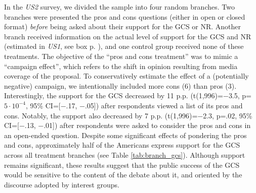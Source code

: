 \begin{bibunit}
In the \textit{US2} survey, we divided the sample into four random branches. Two branches were presented the pros and cons questions (either in open or closed format) \textit{before} being asked about their support for the GCS or NR. Another branch received information on the actual level of support for the GCS and NR (estimated in \textit{US1}, see box p. \pageref{subsec:second_order_beliefs}), %
and one control group received none of these treatments. %
The objective of the ``pros and cons treatment'' was to mimic a ``campaign effect'', which refers to the shift in opinion resulting from media coverage of the proposal.\citep{anderson_can_2023} To conservatively estimate the effect of a (potentially negative) campaign, we intentionally included more cons (6) than pros (3). Interestingly, the support for the GCS decreased by 11 p.p. (t(1,996)=$-$3.5, p=$5\cdot 10^{-4}$, 95\% CI=[$-$.17, $-$.05]) after respondents viewed a list of its pros and cons. %
Notably, the support also decreased by 7 p.p. (t(1,996)=$-$2.3, p=.02, 95\% CI=[$-$.13, $-$.01]) after respondents were asked to consider the pros and cons in an open-ended question. Despite some significant effects of pondering the pros and cons, approximately half of the Americans express support for the GCS across all treatment branches (see Table \ref{tab:branch_gcs}). Although support remains significant, %
these results suggest that the public success of the GCS would be sensitive to the content of the debate about it, and oriented by the discourse adopted by interest groups. %







\end{bibunit}
